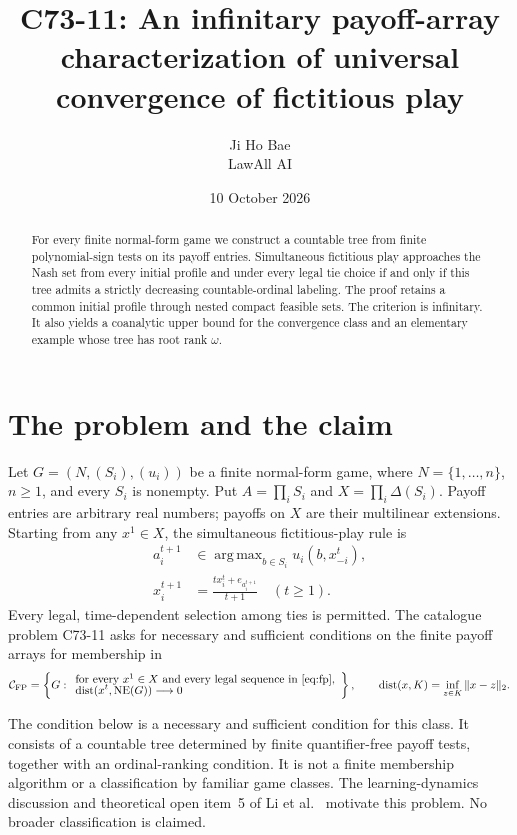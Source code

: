 \documentclass[11pt,a4paper]{article}
\title{C73-11: An infinitary payoff-array characterization\newline
  of universal convergence of fictitious play}
\author{Ji Ho Bae\\\small LawAll AI}
\date{10 October 2026}
\theoremstyle{definition}
\newcommand{\CFP}{\mathcal C_{\mathrm{FP}}}
\DeclareMathOperator{\NE}{NE}
\DeclareMathOperator{\dist}{dist}
\DeclareMathOperator*{\argmax}{arg\,max}
\begin{document}
\maketitle
\begin{abstract}
For every finite normal-form game we construct a countable tree from
finite polynomial-sign tests on its payoff entries. Simultaneous fictitious
play approaches the Nash set from every initial profile and under every
legal tie choice if and only if this tree admits a strictly decreasing
countable-ordinal labeling. The proof retains a common initial profile
through nested compact feasible sets. The criterion is
infinitary. It also yields a coanalytic upper bound for the convergence
class and an elementary example whose tree has root rank $\omega$.
\end{abstract}

\section{The problem and the claim}

Let $G=(N,(S_i),(u_i))$ be a finite normal-form game, where
$N=\{1,\ldots,n\}$, $n\ge1$, and every $S_i$ is nonempty. Put
$A=\prod_iS_i$ and $X=\prod_i\Delta(S_i)$. Payoff entries are arbitrary
real numbers; payoffs on $X$ are their multilinear extensions. Starting
from any $x^1\in X$, the simultaneous fictitious-play rule is
\begin{equation}\label{eq:fp}
 \begin{aligned}
 a_i^{t+1}&\in\argmax_{b\in S_i}u_i(b,x_{-i}^t),\\
 x_i^{t+1}&=\frac{t x_i^t+e_{a_i^{t+1}}}{t+1}\quad(t\ge1).
 \end{aligned}
\end{equation}
Every legal, time-dependent selection among ties is permitted. The
catalogue problem C73-11 asks for necessary and sufficient conditions on
the finite payoff arrays for membership in
\begin{equation}\label{eq:class}
 \CFP=\left\{G:
 \begin{array}{l}
 \text{for every $x^1\in X$ and every legal sequence in \eqref{eq:fp},}\\[-2pt]
 \displaystyle\dist(x^t,\NE(G))\longrightarrow0
 \end{array}\right\},
 \qquad
 \dist(x,K)=\inf_{z\in K}\|x-z\|_2.
\end{equation}

The condition below is a necessary and sufficient condition for this
class. It consists of a countable tree determined by finite
quantifier-free payoff tests, together with an ordinal-ranking condition.
It is not a finite membership algorithm or a classification by familiar
game classes. The learning-dynamics discussion and theoretical open item~5
of Li et al.~\cite{li} motivate this problem.
No broader classification is claimed.
\end{document}
